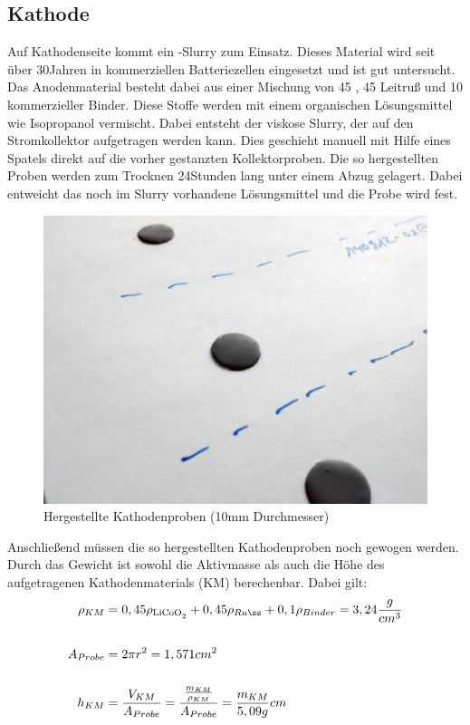 \documentclass[a4paper, 11pt, headsepline,footsepline,twoside,abstract]{scrbook}
\begin{document}
\subsection{Kathode}
Auf Kathodenseite kommt ein -Slurry zum Einsatz. Dieses Material wird seit über 30\;Jahren in kommerziellen Batteriezellen eingesetzt und ist gut untersucht. Das Anodenmaterial besteht dabei aus einer Mischung von \SI{45}{\masspercent} ,  \SI{45}{\masspercent} Leitruß und  \SI{10}{\masspercent} kommerzieller Binder. Diese Stoffe werden mit einem organischen Lösungsmittel wie Isopropanol vermischt. Dabei entsteht der viskose Slurry, der auf den Stromkollektor aufgetragen werden kann. Dies geschieht manuell mit Hilfe eines Spatels direkt auf die vorher gestanzten Kollektorproben. Die so hergestellten Proben werden zum Trocknen 24\;Stunden lang unter einem Abzug gelagert. Dabei entweicht das noch im Slurry vorhandene Lösungsmittel und die Probe wird fest.
\begin{figure}[]
	\centering
	\includegraphics[width=1.0\columnwidth]{images/Kathodenprobe.jpg}
	\caption{Hergestellte Kathodenproben (10mm Durchmesser)}
	\label{kathodenproben}
\end{figure}
Anschließend müssen die so hergestellten Kathodenproben noch gewogen werden. Durch das Gewicht ist sowohl die Aktivmasse als auch die Höhe des aufgetragenen Kathodenmaterials (KM) berechenbar. Dabei gilt:
\begin{equation}
\begin{split}
\rho_{KM} &= 0,45 \rho_{\ce{LiCoO2}} + 0,45 \rho_{Ruß} + 0,1 \rho_{Binder} = 3,24 \frac{g}{cm^3}\\\\
A_{Probe} &= 2 \pi r^2 = 1,571cm^2  \\\\
h_{KM} &= \frac{V_{KM}}{A_{Probe}} = \frac{\frac{m_{KM}}{\rho_{KM}}}{A_{Probe}} =  \frac{m_{KM}}{5,09g}cm\\\\
\end{split}
\end{equation}
\end{document}
